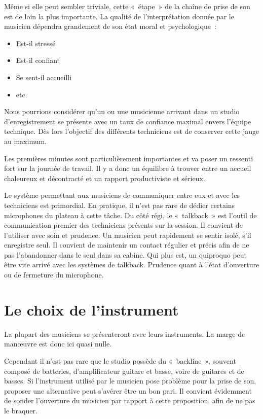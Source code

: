 \documentclass[
]{book}
\providecommand{\tightlist}{%
  \setlength{\itemsep}{0pt}\setlength{\parskip}{0pt}}
\begin{document}
Même si elle peut sembler triviale, cette «~étape~» de la chaîne de prise de son est de loin la plus importante.
La qualité de l'interprétation donnée par le musicien dépendra grandement de son état moral et psychologique~:

\begin{itemize}
\tightlist
\item
  Est-il stressé
\item
  Est-il confiant
\item
  Se sent-il accueilli
\item
  etc.
\end{itemize}

Nous pourrions considérer qu'un ou une musicienne arrivant dans un studio d'enregistrement se présente avec un taux de confiance maximal envers l'équipe technique. Dès lors l'objectif des différents techniciens est de conserver cette jauge au maximum.

Les premières minutes sont particulièrement importantes et va poser un ressenti fort sur la journée de travail. Il y a donc un équilibre à trouver entre un accueil chaleureux et décontracté et un rapport productiviste et sérieux.

Le système permettant aux musiciens de communiquer entre eux et avec les techniciens est primordial. En pratique, il n'est pas rare de dédier certains microphones du plateau à cette tâche. Du côté régi, le «~talkback~» est l'outil de communication premier des techniciens présents sur la session. Il convient de l'utiliser avec soin et prudence. Un musicien peut rapidement se sentir isolé, s'il enregistre seul. Il convient de maintenir un contact régulier et précis afin de ne pas l'abandonner dans le seul dans sa cabine. Qui plus est, un quiproquo peut être vite arrivé avec les systèmes de talkback. Prudence quant à l'état d'ouverture ou de fermeture du microphone.

\hypertarget{le-choix-de-linstrument}{%
\section{Le choix de l'instrument}\label{le-choix-de-linstrument}}

La plupart des musiciens se présenteront avec leurs instruments. La marge de manœuvre est donc ici quasi nulle.

Cependant il n'est pas rare que le studio possède du «~backline~», souvent composé de batteries, d'amplificateur guitare et basse, voire de guitares et de basses. Si l'instrument utilisé par le musicien pose problème pour la prise de son, proposer une alternative peut s'avérer être un bon pari. Il convient évidemment de sonder l'ouverture du musicien par rapport à cette proposition, afin de ne pas le braquer.
\end{document}
